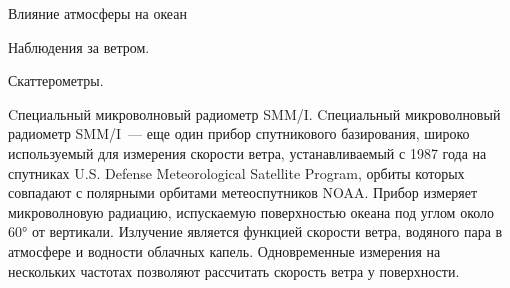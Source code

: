 \begin{chapter}{Влияние атмосферы на океан}
\begin{section}{Наблюдения за ветром.}
\begin{paragraph}{Скаттерометры.}

\end{paragraph}


\begin{paragraph}{Cпециальный микроволновый радиометр SMM/I.}
Cпециальный микроволновый радиометр SMM/I~--- еще один прибор
спутникового базирования, широко используемый для измерения скорости
ветра, устанавливаемый с 1987 года на спутниках U.S. Defense
Meteorological Satellite Program, орбиты которых совпадают с полярными
орбитами метеоспутников NOAA. Прибор измеряет микроволновую радиацию,
испускаемую поверхностью океана под углом около 60° от
вертикали. Излучение является функцией скорости ветра, водяного пара в
атмосфере и водности облачных капель. Одновременные измерения на
нескольких частотах позволяют рассчитать скорость ветра у поверхности.
%


\end{paragraph}
\end{section}
\end{chapter}
